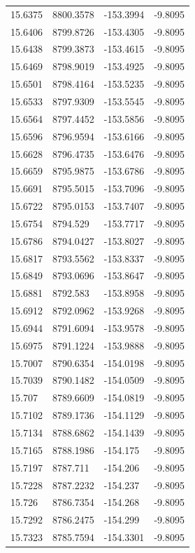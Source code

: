 \begin{table}[H]
\begin{tabular}{llll}
15.6375 & 8800.3578 & -153.3994 & -9.8095 \\
15.6406 & 8799.8726 & -153.4305 & -9.8095 \\
15.6438 & 8799.3873 & -153.4615 & -9.8095 \\
15.6469 & 8798.9019 & -153.4925 & -9.8095 \\
15.6501 & 8798.4164 & -153.5235 & -9.8095 \\
15.6533 & 8797.9309 & -153.5545 & -9.8095 \\
15.6564 & 8797.4452 & -153.5856 & -9.8095 \\
15.6596 & 8796.9594 & -153.6166 & -9.8095 \\
15.6628 & 8796.4735 & -153.6476 & -9.8095 \\
15.6659 & 8795.9875 & -153.6786 & -9.8095 \\
15.6691 & 8795.5015 & -153.7096 & -9.8095 \\
15.6722 & 8795.0153 & -153.7407 & -9.8095 \\
15.6754 & 8794.529 & -153.7717 & -9.8095 \\
15.6786 & 8794.0427 & -153.8027 & -9.8095 \\
15.6817 & 8793.5562 & -153.8337 & -9.8095 \\
15.6849 & 8793.0696 & -153.8647 & -9.8095 \\
15.6881 & 8792.583 & -153.8958 & -9.8095 \\
15.6912 & 8792.0962 & -153.9268 & -9.8095 \\
15.6944 & 8791.6094 & -153.9578 & -9.8095 \\
15.6975 & 8791.1224 & -153.9888 & -9.8095 \\
15.7007 & 8790.6354 & -154.0198 & -9.8095 \\
15.7039 & 8790.1482 & -154.0509 & -9.8095 \\
15.707 & 8789.6609 & -154.0819 & -9.8095 \\
15.7102 & 8789.1736 & -154.1129 & -9.8095 \\
15.7134 & 8788.6862 & -154.1439 & -9.8095 \\
15.7165 & 8788.1986 & -154.175 & -9.8095 \\
15.7197 & 8787.711 & -154.206 & -9.8095 \\
15.7228 & 8787.2232 & -154.237 & -9.8095 \\
15.726 & 8786.7354 & -154.268 & -9.8095 \\
15.7292 & 8786.2475 & -154.299 & -9.8095 \\
15.7323 & 8785.7594 & -154.3301 & -9.8095 \\

\end{tabular}
\end{table}
